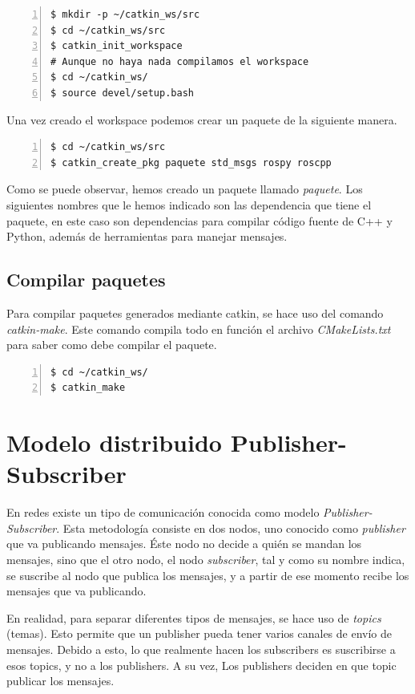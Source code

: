 		\begin{lstlisting}[style=consola,numbers=left]
$ mkdir -p ~/catkin_ws/src
$ cd ~/catkin_ws/src
$ catkin_init_workspace
# Aunque no haya nada compilamos el workspace
$ cd ~/catkin_ws/
$ source devel/setup.bash
		\end{lstlisting}
		
		Una vez creado el workspace podemos crear un paquete de la siguiente manera.
		
		\begin{lstlisting}[style=consola,numbers=left]
$ cd ~/catkin_ws/src
$ catkin_create_pkg paquete std_msgs rospy roscpp
		\end{lstlisting}
		
		Como se puede observar, hemos creado un paquete llamado \textit{paquete}. Los siguientes nombres que le hemos indicado son las dependencia que tiene el paquete, en este caso son dependencias para compilar código fuente de C++ y Python, además de herramientas para manejar mensajes.
		
		\subsection{Compilar paquetes}
		
		Para compilar paquetes generados mediante catkin, se hace uso del comando \emph{catkin-make}. Este comando compila todo en función el archivo \emph{CMakeLists.txt} para saber como debe compilar el paquete.
		
		\begin{lstlisting}[style=consola,numbers=left]
$ cd ~/catkin_ws/
$ catkin_make
		\end{lstlisting}
		
	\section{Modelo distribuido Publisher-Subscriber}
	
	En redes existe un tipo de comunicación conocida como modelo \emph{Publisher-Subscriber}. Esta metodología consiste en dos nodos, uno conocido como \emph{publisher} que va publicando mensajes. Éste nodo no decide a quién se mandan los mensajes, sino que el otro nodo, el nodo \emph{subscriber}, tal y como su nombre indica, se suscribe al nodo que publica los mensajes, y a partir de ese momento recibe los mensajes que va publicando.
	
	En realidad, para separar diferentes tipos de mensajes, se hace uso de \emph{topics} (temas). Esto permite que un publisher pueda tener varios canales de envío de mensajes. Debido a esto, lo que realmente hacen los subscribers es suscribirse a esos topics, y no a los publishers. A su vez, Los publishers deciden en que topic publicar los mensajes.
	
